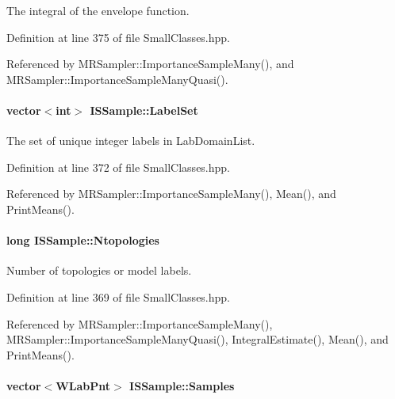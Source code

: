 \-The integral of the envelope function. 



\-Definition at line 375 of file \-Small\-Classes.\-hpp.



\-Referenced by \-M\-R\-Sampler\-::\-Importance\-Sample\-Many(), and \-M\-R\-Sampler\-::\-Importance\-Sample\-Many\-Quasi().

\hypertarget{classISSample_a7aeb58094643516127d1df6fe71fec3c}{
\paragraph[{\-Label\-Set}]{\setlength{\rightskip}{0pt plus 5cm}vector$<$int$>$ {\bf \-I\-S\-Sample\-::\-Label\-Set}}}\label{classISSample_a7aeb58094643516127d1df6fe71fec3c}


\-The set of unique integer labels in \-Lab\-Domain\-List. 



\-Definition at line 372 of file \-Small\-Classes.\-hpp.



\-Referenced by \-M\-R\-Sampler\-::\-Importance\-Sample\-Many(), \-Mean(), and \-Print\-Means().

\hypertarget{classISSample_a83dec86101f85594fee6ed9f55954445}{
\paragraph[{\-Ntopologies}]{\setlength{\rightskip}{0pt plus 5cm}long {\bf \-I\-S\-Sample\-::\-Ntopologies}}}\label{classISSample_a83dec86101f85594fee6ed9f55954445}


\-Number of topologies or model labels. 



\-Definition at line 369 of file \-Small\-Classes.\-hpp.



\-Referenced by \-M\-R\-Sampler\-::\-Importance\-Sample\-Many(), \-M\-R\-Sampler\-::\-Importance\-Sample\-Many\-Quasi(), \-Integral\-Estimate(), \-Mean(), and \-Print\-Means().

\hypertarget{classISSample_a07b1930fbb119b2561e1ad4fdd760e0f}{
\paragraph[{\-Samples}]{\setlength{\rightskip}{0pt plus 5cm}vector$<${\bf \-W\-Lab\-Pnt}$>$ {\bf \-I\-S\-Sample\-::\-Samples}}}\label{classISSample_a07b1930fbb119b2561e1ad4fdd760e0f}


